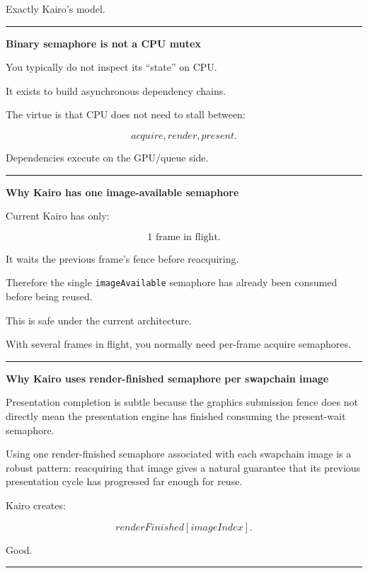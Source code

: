Exactly Kairo's model.

\begin{center}\rule{0.5\linewidth}{0.5pt}\end{center}

\textbf{Binary semaphore is not a CPU mutex}

You typically do not inspect its ``state'' on CPU.

It exists to build asynchronous dependency chains.

The virtue is that CPU does not need to stall between:

\[
acquire,
render,
present.
\]

Dependencies execute on the GPU/queue side.

\begin{center}\rule{0.5\linewidth}{0.5pt}\end{center}

\textbf{Why Kairo has one image-available semaphore}

Current Kairo has only:

\[
1\text{ frame in flight}.
\]

It waits the previous frame's fence before reacquiring.

Therefore the single \texttt{imageAvailable} semaphore has already been consumed before being reused.

This is safe under the current architecture.

With several frames in flight, you normally need per-frame acquire semaphores.

\begin{center}\rule{0.5\linewidth}{0.5pt}\end{center}

\textbf{Why Kairo uses render-finished semaphore per swapchain image}

Presentation completion is subtle because the graphics submission fence does not directly mean the presentation engine has finished consuming the present-wait semaphore.

Using one render-finished semaphore associated with each swapchain image is a robust pattern: reacquiring that image gives a natural guarantee that its previous presentation cycle has progressed far enough for reuse.

Kairo creates:

\[
renderFinished[imageIndex].
\]

Good.

\begin{center}\rule{0.5\linewidth}{0.5pt}\end{center}

